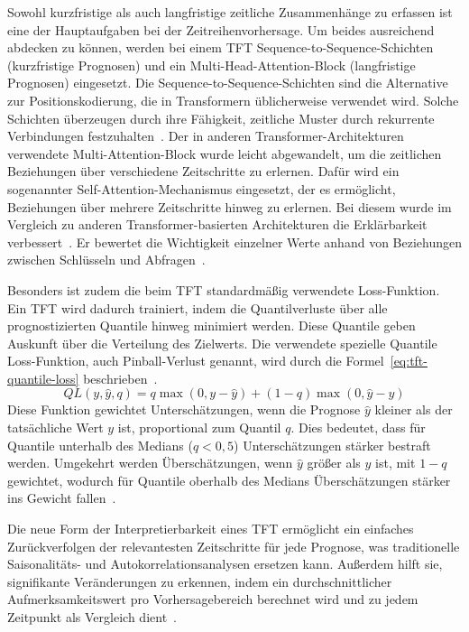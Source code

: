 Sowohl kurzfristige als auch langfristige zeitliche Zusammenhänge zu erfassen ist eine der Hauptaufgaben bei der Zeitreihenvorhersage.
Um beides ausreichend abdecken zu können, werden bei einem \ac{TFT} Sequence-to-Sequence-Schichten (kurzfristige Prognosen) und ein Multi-Head-Attention-Block (langfristige Prognosen) eingesetzt.
Die Sequence-to-Sequence-Schichten sind die Alternative zur Positionskodierung, die in Transformern üblicherweise verwendet wird.
Solche Schichten überzeugen durch ihre Fähigkeit, zeitliche Muster durch rekurrente Verbindungen festzuhalten~\cite{Labiadh.2023}.
Der in anderen Transformer-Architekturen verwendete Multi-Attention-Block wurde leicht abgewandelt, um die zeitlichen Beziehungen über verschiedene Zeitschritte zu erlernen.
Dafür wird ein sogenannter Self-Attention-Mechanismus eingesetzt, der es ermöglicht, Beziehungen über mehrere Zeitschritte hinweg zu erlernen.
Bei diesem wurde im Vergleich zu anderen Transformer-basierten Architekturen die Erklärbarkeit verbessert~\cite{Lim.19.12.2019}.
Er bewertet die Wichtigkeit einzelner Werte anhand von Beziehungen zwischen Schlüsseln und Abfragen~\cite{Labiadh.2023}.

Besonders ist zudem die beim \ac{TFT} standardmäßig verwendete Loss-Funktion.
Ein \ac{TFT} wird dadurch trainiert, indem die Quantilverluste über alle prognostizierten Quantile hinweg minimiert werden.
Diese Quantile geben Auskunft über die Verteilung des Zielwerts.
Die verwendete spezielle Quantile Loss-Funktion, auch Pinball-Verlust genannt, wird durch die Formel~\ref{eq:tft-quantile-loss} beschrieben~\cite{Labiadh.2023}.
\begin{equation}
 \label{eq:tft-quantile-loss}
 QL(y, \hat{y}, q) = q \max(0, y - \hat{y}) + (1 - q) \max(0, \hat{y} - y)
\end{equation}
Diese Funktion gewichtet Unterschätzungen, wenn die Prognose $\hat{y}$ kleiner als der tatsächliche Wert $y$ ist, proportional zum Quantil $q$.
Dies bedeutet, dass für Quantile unterhalb des Medians ($q < 0,5$) Unterschätzungen stärker bestraft werden.
Umgekehrt werden Überschätzungen, wenn $\hat{y}$ größer als $y$ ist, mit $1 - q$ gewichtet, wodurch für Quantile oberhalb des Medians Überschätzungen stärker ins Gewicht fallen~\cite{Efimov.29.10.2023}.

Die neue Form der Interpretierbarkeit eines \ac{TFT} ermöglicht ein einfaches Zurückverfolgen der relevantesten Zeitschritte für jede Prognose, was traditionelle Saisonalitäts- und Autokorrelationsanalysen ersetzen kann.
Außerdem hilft sie, signifikante Veränderungen zu erkennen, indem ein durchschnittlicher Aufmerksamkeitswert pro Vorhersagebereich berechnet wird und zu jedem Zeitpunkt als Vergleich dient~\cite{Labiadh.2023}.

